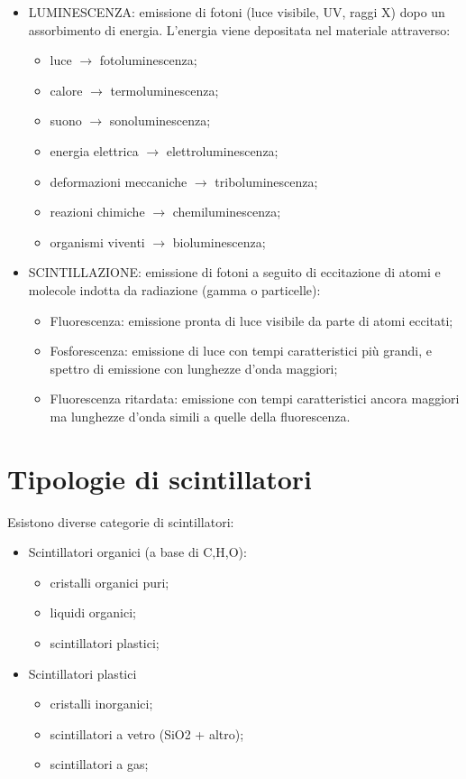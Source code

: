 \documentclass[12pt, letterpaper]{book}
\begin{document}
\begin{itemize}
    \item LUMINESCENZA: emissione di fotoni  (luce visibile, UV, raggi X) dopo un assorbimento di energia. L'energia viene depositata nel materiale attraverso:
    \begin{itemize}
        \item luce $\rightarrow$ fotoluminescenza;
        \item calore $\rightarrow$ termoluminescenza;
        \item suono $\rightarrow$ sonoluminescenza;
        \item energia elettrica $\rightarrow$ elettroluminescenza;
        \item deformazioni meccaniche $\rightarrow$ triboluminescenza;
        \item reazioni chimiche $\rightarrow$ chemiluminescenza;
        \item organismi viventi $\rightarrow$ bioluminescenza;
    \end{itemize}
    \item SCINTILLAZIONE: emissione di fotoni a seguito di eccitazione di atomi e molecole indotta da radiazione (gamma o particelle):
    \begin{itemize}
        \item Fluorescenza:  emissione pronta di luce visibile da parte di atomi eccitati;
        \item Fosforescenza: emissione di luce con tempi caratteristici più grandi, e spettro di emissione con lunghezze d’onda maggiori;
        \item Fluorescenza ritardata: emissione con tempi caratteristici ancora maggiori ma lunghezze d’onda simili a quelle della fluorescenza.
    \end{itemize}
\end{itemize}

\section{Tipologie di scintillatori}
Esistono diverse categorie di scintillatori:
\begin{itemize}
    \item Scintillatori organici (a base di C,H,O):
    \begin{itemize}
        \item cristalli organici puri;
        \item liquidi organici;
        \item scintillatori plastici;
    \end{itemize}
    \item Scintillatori plastici
    \begin{itemize}
        \item cristalli inorganici;
        \item scintillatori a vetro (SiO2 + altro);
        \item scintillatori a gas;
    \end{itemize}
\end{itemize}
\end{document}

